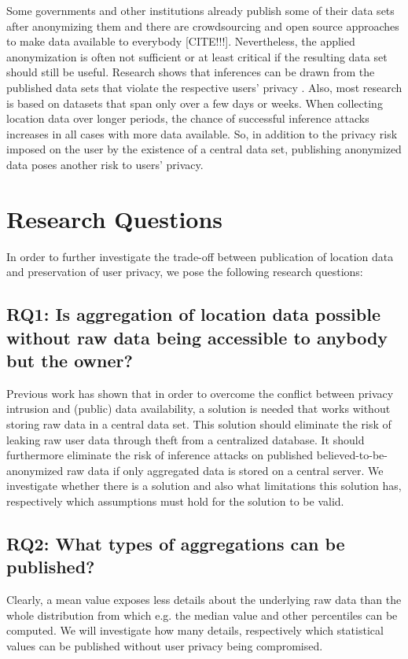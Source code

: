 Some governments and other institutions already publish some of their data sets after anonymizing them 
and there are crowdsourcing and open source approaches to make data available to everybody [CITE!!!]. 
Nevertheless, the applied anonymization is often not sufficient or at least critical if the resulting data set should still be useful. Research shows that inferences can be drawn from the published data sets that violate the respective users' privacy \parencite{cellphone, twitter}. Also, most research is based on datasets that span only over a few days or weeks. When collecting location data over longer periods, the chance of successful inference attacks increases in all cases with more data available. So, in addition to the privacy risk imposed on the user by the existence of a central data set, publishing anonymized data poses another risk to users' privacy.

\section{Research Questions}
In order to further investigate the trade-off between publication of location data and preservation of user privacy, we pose the following research questions:

\subsection*{RQ1: Is aggregation of location data possible without raw data being accessible to anybody but the owner?}
Previous work has shown that in order to overcome the conflict between privacy intrusion and (public) data availability, a solution is needed that works without storing raw data in a central data set.
This solution should eliminate the risk of leaking raw user data through theft from a centralized database. It should furthermore eliminate the risk of inference attacks on published believed-to-be-anonymized raw data if only aggregated data is stored on a central server. We investigate whether there is a solution and also what limitations this solution has, respectively which assumptions must hold for the solution to be valid.

\subsection*{RQ2: What types of aggregations can be published?}
Clearly, a mean value exposes less details about the underlying raw data than the whole distribution from which e.g. the median value and other percentiles can be computed. We will investigate how many details, respectively which statistical values can be published without user privacy being compromised.

